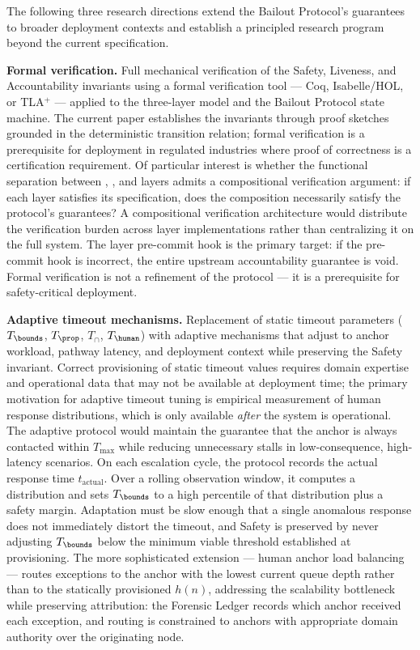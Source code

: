 The following three research directions extend the Bailout Protocol's guarantees to broader deployment contexts and establish a principled research program beyond the current specification.

\medskip\noindent\textbf{Formal verification.} Full mechanical verification of the Safety, Liveness, and Accountability invariants using a formal verification tool — Coq, Isabelle/HOL, or TLA$^+$ — applied to the three-layer model and the Bailout Protocol state machine. The current paper establishes the invariants through proof sketches grounded in the deterministic transition relation; formal verification is a prerequisite for deployment in regulated industries where proof of correctness is a certification requirement. Of particular interest is whether the functional separation between \purpose{}, \bounds{}, and \fact{} layers admits a compositional verification argument: if each layer satisfies its specification, does the composition necessarily satisfy the protocol's guarantees? A compositional verification architecture would distribute the verification burden across layer implementations rather than centralizing it on the full system. The \fact{} layer pre-commit hook is the primary target: if the pre-commit hook is incorrect, the entire upstream accountability guarantee is void. Formal verification is not a refinement of the protocol — it is a prerequisite for safety-critical deployment.

\medskip\noindent\textbf{Adaptive timeout mechanisms.} Replacement of static timeout parameters ($T_{\bounds}$, $T_{\prop}$, $T_{\cap}$, $T_{\human}$) with adaptive mechanisms that adjust to anchor workload, pathway latency, and deployment context while preserving the Safety invariant. Correct provisioning of static timeout values requires domain expertise and operational data that may not be available at deployment time; the primary motivation for adaptive timeout tuning is empirical measurement of human response distributions, which is only available \emph{after} the system is operational. The adaptive protocol would maintain the guarantee that the anchor is always contacted within $T_{\max}$ while reducing unnecessary stalls in low-consequence, high-latency scenarios. On each escalation cycle, the protocol records the actual response time $t_{\mathrm{actual}}$. Over a rolling observation window, it computes a distribution and sets $T_{\bounds}$ to a high percentile of that distribution plus a safety margin. Adaptation must be slow enough that a single anomalous response does not immediately distort the timeout, and Safety is preserved by never adjusting $T_{\bounds}$ below the minimum viable threshold established at provisioning. The more sophisticated extension — human anchor load balancing — routes exceptions to the anchor with the lowest current queue depth rather than to the statically provisioned $h(n)$, addressing the scalability bottleneck while preserving attribution: the Forensic Ledger records which anchor received each exception, and routing is constrained to anchors with appropriate domain authority over the originating node.

